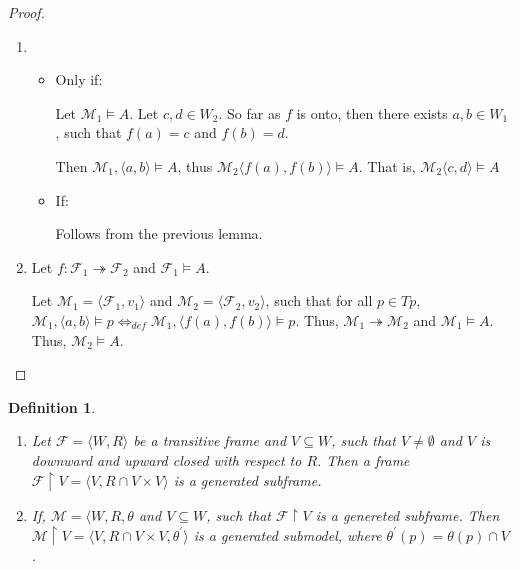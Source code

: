 \documentclass[a4paper]{article}
\theoremstyle{defin}
\newtheorem{defin}{Definition}
\theoremstyle{theorem}
\theoremstyle{prop}
\theoremstyle{lemma}
\theoremstyle{ex}
\theoremstyle{col}
\begin{document}
\begin{proof}
$ $

\begin{enumerate}
  \item
  \begin{itemize}
    \item Only if:

    Let $\mathcal{M}_1 \models A$. Let $c, d \in W_2$. So far as $f$ is onto, then there exists $a, b \in W_1$, such that $f(a) = c$ and $f(b) = d$.

    Then $\mathcal{M}_1, \langle a, b \rangle \models A$, thus $\mathcal{M}_2 \langle f(a), f(b) \rangle \models A$.
    That is, $\mathcal{M}_2 \langle c, d \rangle \models A$

    \item If:

    Follows from the previous lemma.
  \end{itemize}
  \item Let $f : \mathcal{F}_1 \twoheadrightarrow \mathcal{F}_2$ and $\mathcal{F}_1 \models A$.

  Let $\mathcal{M}_1 = \langle \mathcal{F}_1, v_1 \rangle$ and $\mathcal{M}_2 = \langle \mathcal{F}_2, v_2 \rangle$, such that
  for all $p \in Tp$, $\mathcal{M}_1, \langle a, b \rangle \models p \Leftrightarrow_{def} \mathcal{M}_1, \langle f(a), f(b) \rangle \models p$.
  Thus, $\mathcal{M}_1 \twoheadrightarrow \mathcal{M}_2$ and $\mathcal{M}_1 \models A$. Thus, $\mathcal{M}_2 \models A$.
\end{enumerate}
\end{proof}

\begin{defin}
  $ $

\begin{enumerate}
  \item Let $\mathcal{F} = \langle W, R \rangle$ be a transitive frame and $V \subseteq W$, such that $V \neq \emptyset$ and $V$ is
  downward and upward closed with respect to $R$. Then a frame $\mathcal{F} \restriction V = \langle V, R \cap V \times V \rangle$ is a generated subframe.
  \item If, $\mathcal{M} = \langle W, R, \theta$ and $V \subseteq W$, such that $\mathcal{F} \restriction V$ is a genereted subframe. Then
  $\mathcal{M} \restriction V = \langle V, R \cap V \times V, \theta^{'}\rangle$ is a generated submodel, where $\theta^{'}(p) = \theta(p) \cap V$.
\end{enumerate}
\end{defin}
\end{document}

